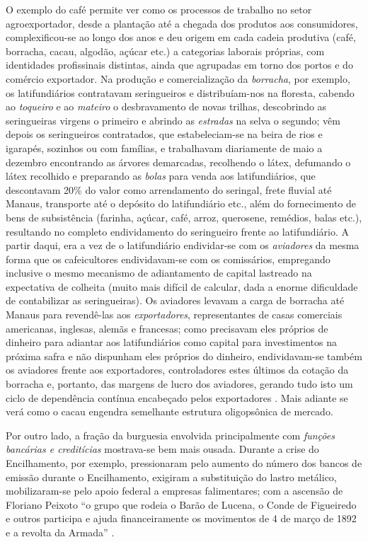 O exemplo do café permite ver como os processos de trabalho no setor agroexportador, desde a plantação até a chegada dos produtos aos consumidores, complexificou-se ao longo dos anos e deu origem em cada cadeia produtiva (café, borracha, cacau, algodão, açúcar etc.) a categorias laborais próprias, com identidades profissinais distintas, ainda que agrupadas em torno dos portos e do comércio exportador. Na produção e comercialização da \textit{borracha}, por exemplo, os latifundiários contratavam seringueiros e distribuíam-nos na floresta, cabendo ao \textit{toqueiro} e ao \textit{mateiro} o desbravamento de novas trilhas, descobrindo as seringueiras virgens o primeiro e abrindo as \textit{estradas} na selva o segundo; vêm depois os seringueiros contratados, que estabeleciam-se na beira de rios e igarapés, sozinhos ou com famílias, e trabalhavam diariamente de maio a dezembro encontrando as árvores demarcadas, recolhendo o látex, defumando o látex recolhido e preparando as \textit{bolas} para venda aos latifundiários, que descontavam 20\% do valor como arrendamento do seringal, frete fluvial até Manaus, transporte até o depósito do latifundiário etc., além do fornecimento de bens de subsistência (farinha, açúcar, café, arroz, querosene, remédios, balas etc.), resultando no completo endividamento do seringueiro frente ao latifundiário. A partir daqui, era a vez de o latifundiário endividar-se com os \textit{aviadores} da mesma forma que os cafeicultores endividavam-se com os comissários, empregando inclusive o mesmo mecanismo de adiantamento de capital lastreado na expectativa de colheita (muito mais difícil de calcular, dada a enorme dificuldade de contabilizar as seringueiras). Os aviadores levavam a carga de borracha até Manaus para revendê-las aos \textit{exportadores}, representantes de casas comerciais americanas, inglesas, alemãs e francesas; como precisavam eles próprios de dinheiro para adiantar aos latifundiários como capital para investimentos na próxima safra e não dispunham eles próprios do dinheiro, endividavam-se também os aviadores frente aos exportadores, controladores estes últimos da cotação da borracha e, portanto, das margens de lucro dos aviadores, gerando tudo isto um ciclo de dependência contínua encabeçado pelos exportadores \cite[pp.~62-68]{CARONE1970inst}. Mais adiante se verá como o cacau engendra semelhante estrutura oligopsônica de mercado.

Por outro lado, a fração da burguesia envolvida principalmente com \textit{funções bancárias e creditícias} mostrava-se bem mais ousada. Durante a crise do Encilhamento, por exemplo, pressionaram pelo aumento do número dos bancos de emissão durante o Encilhamento, exigiram a substituição do lastro metálico, mobilizaram-se pelo apoio federal a empresas falimentares; com a ascensão de Floriano Peixoto ``o grupo que rodeia o Barão de Lucena, o Conde de Figueiredo e outros participa e ajuda financeiramente os movimentos de 4 de março de 1892 e a revolta da Armada'' \cite[pp.~158-159]{CARONE1970inst}.

